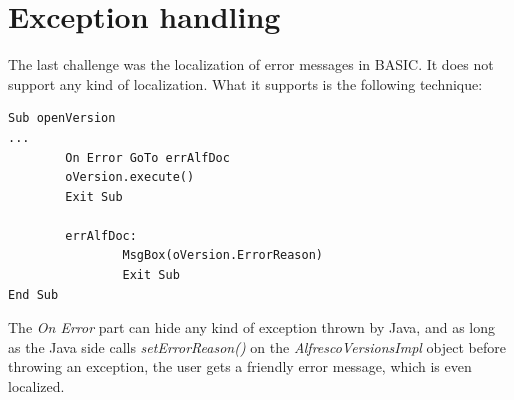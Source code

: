 \section{Exception handling}

The last challenge was the localization of error messages in BASIC. It does not
support any kind of localization. What it supports is the following technique:

\begin{lstlisting}
Sub openVersion
...
        On Error GoTo errAlfDoc
        oVersion.execute()
        Exit Sub

        errAlfDoc:
                MsgBox(oVersion.ErrorReason)
                Exit Sub
End Sub
\end{lstlisting}

The \emph{On Error} part can hide any kind of exception thrown by Java, and as
long as the Java side calls \emph{setErrorReason()} on the
\emph{AlfrescoVersionsImpl} object before throwing an exception, the user gets
a friendly error message, which is even localized.
